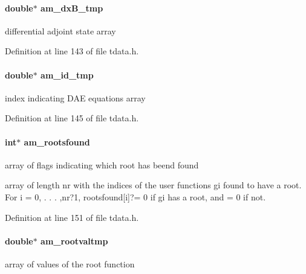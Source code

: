 \hypertarget{struct_temp_data_a24382a26672aa3895d846a86981f36fd}{}
\paragraph[{am\+\_\+dx\+B\+\_\+tmp}]{\setlength{\rightskip}{0pt plus 5cm}double$\ast$ am\+\_\+dx\+B\+\_\+tmp}\label{struct_temp_data_a24382a26672aa3895d846a86981f36fd}
differential adjoint state array 

Definition at line 143 of file tdata.\+h.

\hypertarget{struct_temp_data_a3ae8375babdd7bfd0b0b05a158f36b1a}{}
\paragraph[{am\+\_\+id\+\_\+tmp}]{\setlength{\rightskip}{0pt plus 5cm}double$\ast$ am\+\_\+id\+\_\+tmp}\label{struct_temp_data_a3ae8375babdd7bfd0b0b05a158f36b1a}
index indicating D\+A\+E equations array 

Definition at line 145 of file tdata.\+h.

\hypertarget{struct_temp_data_a7aead84117fd84087a23d968ea56b542}{}
\paragraph[{am\+\_\+rootsfound}]{\setlength{\rightskip}{0pt plus 5cm}int$\ast$ am\+\_\+rootsfound}\label{struct_temp_data_a7aead84117fd84087a23d968ea56b542}
array of flags indicating which root has beend found

array of length nr with the indices of the user functions gi found to have a root. For i = 0, . . . ,nr?1, rootsfound\mbox{[}i\mbox{]}?= 0 if gi has a root, and = 0 if not. 

Definition at line 151 of file tdata.\+h.

\hypertarget{struct_temp_data_aa6a5cd387c4d5257f9f8de9b04af666b}{}
\paragraph[{am\+\_\+rootvaltmp}]{\setlength{\rightskip}{0pt plus 5cm}double$\ast$ am\+\_\+rootvaltmp}\label{struct_temp_data_aa6a5cd387c4d5257f9f8de9b04af666b}
array of values of the root function 

